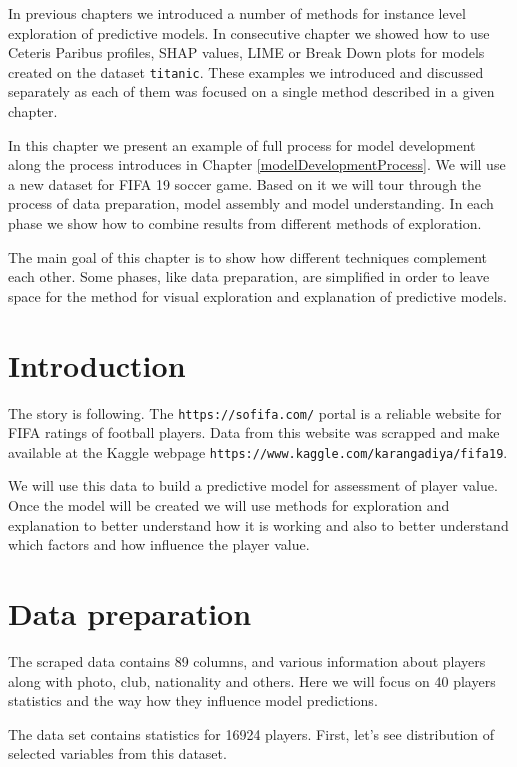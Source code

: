 \documentclass[]{krantz}
\begin{document}
In previous chapters we introduced a number of methods for instance level exploration of predictive models. In consecutive chapter we showed how to use Ceteris Paribus profiles, SHAP values, LIME or Break Down plots for models created on the dataset \texttt{titanic}. These examples we introduced and discussed separately as each of them was focused on a single method described in a given chapter.

In this chapter we present an example of full process for model development along the process introduces in Chapter \ref{modelDevelopmentProcess}. We will use a new dataset for FIFA 19 soccer game. Based on it we will tour through the process of data preparation, model assembly and model understanding. In each phase we show how to combine results from different methods of exploration.

The main goal of this chapter is to show how different techniques complement each other. Some phases, like data preparation, are simplified in order to leave space for the method for visual exploration and explanation of predictive models.

\hypertarget{introduction-1}{%
\section{Introduction}\label{introduction-1}}

The story is following. The \texttt{https://sofifa.com/} portal is a reliable website for FIFA ratings of football players. Data from this website was scrapped and make available at the Kaggle webpage \texttt{https://www.kaggle.com/karangadiya/fifa19}.

We will use this data to build a predictive model for assessment of player value. Once the model will be created we will use methods for exploration and explanation to better understand how it is working and also to better understand which factors and how influence the player value.

\hypertarget{data-preparation}{%
\section{Data preparation}\label{data-preparation}}

The scraped data contains 89 columns, and various information about players along with photo, club, nationality and others.
Here we will focus on 40 players statistics and the way how they influence model predictions.

The data set contains statistics for 16924 players. First, let's see distribution of selected variables from this dataset.
\end{document}
